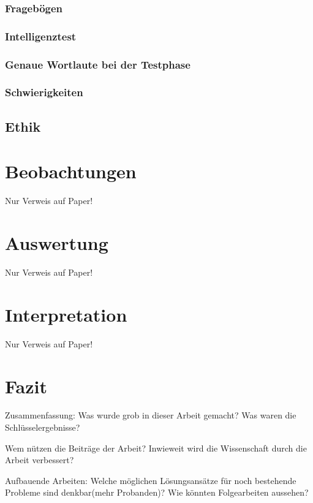 \documentclass{Bericht}
\begin{document}
		\subsubsection{Fragebögen}
		\subsubsection{Intelligenztest}
		\subsubsection{Genaue Wortlaute bei der Testphase}
		\subsubsection{Schwierigkeiten}
	\subsection{Ethik}

\section{Beobachtungen}
	Nur Verweis auf Paper!

\section{Auswertung}
	Nur Verweis auf Paper!

\section{Interpretation}
	Nur Verweis auf Paper!
	
\section{Fazit}

	Zusammenfassung: Was wurde grob in dieser Arbeit gemacht? Was waren die Schlüsselergebnisse?

	Wem nützen die Beiträge der Arbeit? Inwieweit wird die Wissenschaft durch die Arbeit verbessert?

	Aufbauende Arbeiten: Welche möglichen Lösungsansätze für noch bestehende Probleme sind denkbar(mehr Probanden)? Wie könnten Folgearbeiten aussehen?
\end{document}
